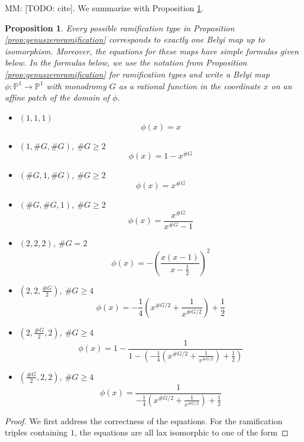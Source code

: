 \documentclass{dcthesis}
\newcommand{\PP}{\mathbb P}
\newcommand{\mm}[1]{{\color{blue} \sf MM: [#1]}}
\numberwithin{equation}{section}
\newtheorem{prop}[equation]{Proposition}
\theoremstyle{definition}
\theoremstyle{remark}
\begin{document}
{{    \mm{TODO: cite}\cite{turkishbelyithesis}.
    We summarize with Proposition \ref{prop:turkishbelyithesis}.
    \begin{prop}\label{prop:turkishbelyithesis}
      Every possible ramification type in
      Proposition \ref{prop:genuszeroramification}
      corresponds to exactly one Belyi map up to isomorphism.
      Moreover, the equations for these maps have simple formulas
      given below.
      In the formulas below,
      we use the notation from Proposition \ref{prop:genuszeroramification}
      for ramification types and write a Belyi map
      $\phi:\PP^1\to\PP^1$ with monodromy $G$
      as a rational function in the coordinate $x$
      on an affine patch of the domain of $\phi$.
      \begin{itemize}
        \item
          $(1,1,1)$
          \[
            \phi(x) = x
          \]
        \item
          $(1,\#G, \#G)$, $\#G\ge 2$
          \[
            \phi(x) = 1-x^{\#G}
          \]
        \item
          $(\#G, 1, \#G)$, $\#G\ge 2$
          \[
            \phi(x) = x^{\#G}
          \]
        \item
          $(\#G, \#G, 1)$, $\#G\ge 2$
          \[
            \phi(x) = \frac{x^{\#G}}{x^{\#G}-1}
          \]
        \item
          $(2, 2, 2)$, $\#G = 2$
          \[
            \phi(x) = -\left(\frac{x(x-1)}{x-\frac{1}{2}}\right)^2
          \]
        \item
          $(2, 2, \frac{\#G}{2})$, $\#G\ge 4$
          \[
            \phi(x) = -\frac{1}{4}\left(x^{\#G/2}+\frac{1}{x^{\#G/2}}\right)
            +\frac{1}{2}
          \]
        \item
          $(2, \frac{\#G}{2}, 2)$, $\#G\ge 4$
          \[
            \phi(x) = 1-\frac{1}{1-\left(-\frac{1}{4}\left(x^{\#G/2}+\frac{1}{x^{\#G/2}}\right)
            +\frac{1}{2}\right)}
          \]
        \item
          $(\frac{\#G}{2}, 2, 2)$, $\#G\ge 4$
          \[
            \phi(x) = \frac{1}{-\frac{1}{4}\left(x^{\#G/2}+\frac{1}{x^{\#G/2}}\right)
            +\frac{1}{2}}
          \]
      \end{itemize}
    \end{prop}
    \begin{proof}
      We first address the correctness of the equations.
      For the ramification triples containing $1$,
      the equations are all lax isomorphic to one of the form

\end{proof}}}
\end{document}
